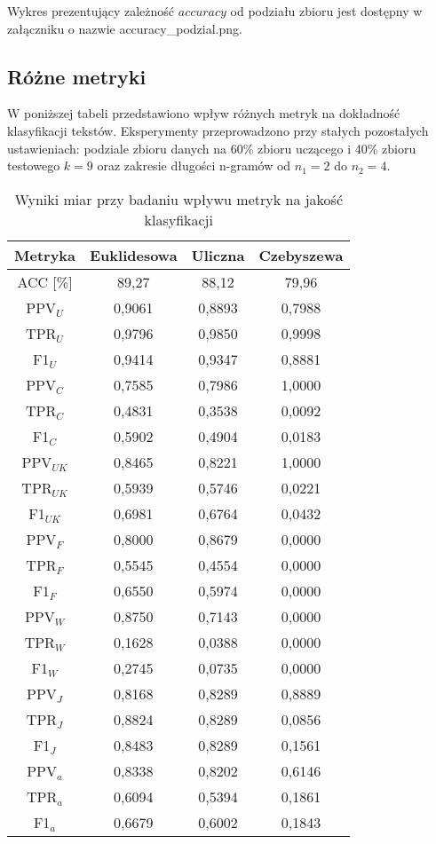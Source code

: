 \documentclass{article}
\begin{document}
Wykres prezentujący zależność \(accuracy\) od podziału zbioru jest dostępny w załączniku o nazwie accuracy\_podzial.png.

\subsection{Różne metryki}
W poniższej tabeli przedstawiono wpływ różnych metryk na dokładność klasyfikacji tekstów. Eksperymenty przeprowadzono przy stałych pozostałych ustawieniach: podziale zbioru danych na 60\% zbioru uczącego i 40\% zbioru testowego \(k = 9\) oraz zakresie długości n-gramów od \(n_1 = 2\) do \(n_2 = 4\). \\

\begin{table}[H]
    \centering
    \begin{tabular}{|c|c|c|c|}
    \hline
    \textbf{Metryka} & \textbf{Euklidesowa} & \textbf{Uliczna} & \textbf{Czebyszewa}  \\ \hline
    ACC [\%] & 89,27 & 88,12 & 79,96\\ \hline
    PPV\(_U\) & 0,9061 & 0,8893 & 0,7988\\ \hline
    TPR\(_U\) & 0,9796& 0,9850 & 0,9998\\ \hline
    F1\(_U\)  & 0,9414& 0,9347 & 0,8881\\ \hline
    PPV\(_C\) & 0,7585& 0,7986 & 1,0000\\ \hline
    TPR\(_C\) &  0,4831& 0,3538 & 0,0092\\ \hline
    F1\(_C\) & 0,5902& 0,4904 & 0,0183\\ \hline
    PPV\(_{UK}\) & 0,8465& 0,8221 & 1,0000\\ \hline
    TPR\(_{UK}\) & 0,5939& 0,5746 & 0,0221\\ \hline
    F1\(_{UK}\) & 0,6981& 0,6764 & 0,0432\\ \hline
    PPV\(_F\) & 0,8000& 0,8679 & 0,0000\\ \hline
    TPR\(_F\) & 0,5545& 0,4554 & 0,0000\\ \hline
    F1\(_F\) & 0,6550& 0,5974 & 0,0000\\ \hline
    PPV\(_W\) & 0,8750& 0,7143 & 0,0000\\ \hline
    TPR\(_W\) & 0,1628& 0,0388 & 0,0000\\ \hline
    F1\(_W\) & 0,2745& 0,0735 & 0,0000\\ \hline
    PPV\(_J\) & 0,8168& 0,8289 & 0,8889\\ \hline
    TPR\(_J\) & 0,8824& 0,8289 & 0,0856\\ \hline
    F1\(_J\) & 0,8483 & 0,8289 & 0,1561\\ \hline
    PPV\(_a\) & 0,8338 & 0,8202 & 0,6146\\ \hline
    TPR\(_a\) &  0,6094 & 0,5394 & 0,1861\\ \hline
    F1\(_a\) & 0,6679 & 0,6002 & 0,1843\\ \hline
    \end{tabular}
    \caption{Wyniki miar przy badaniu wpływu metryk na jakość klasyfikacji}
\end{table}\
\end{document}
